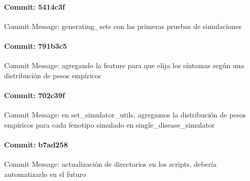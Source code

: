 \documentclass{article}
\begin{document}
\paragraph{Commit: 5414c3f}
Commit Message: generating_sets con las primeras pruebas de simulaciones

\paragraph{Commit: 791b3c5}
Commit Message: agregando la feature para que elija los síntomas según una distribución de pesos empíricos

\paragraph{Commit: 702c39f}
Commit Message: en set_simulator_utils, agregamos la distribución de pesos empíricos para cada fenotipo simulado en single_disease_simulator

\paragraph{Commit: b7ad258}
Commit Message: actualización de directorios en los scripts, debería automatizarlo en el futuro

\end{document}
